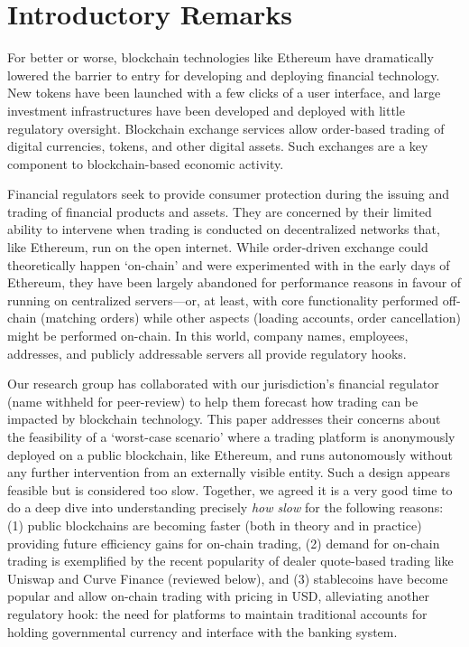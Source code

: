 
\section{Introductory Remarks}

For better or worse, blockchain technologies like Ethereum have dramatically lowered the barrier to entry for developing and deploying financial technology. New tokens have been launched with a few clicks of a user interface, and large investment infrastructures have been developed and deployed with little regulatory oversight. Blockchain exchange services allow order-based trading of digital currencies, tokens, and other digital assets. Such exchanges are a key component to blockchain-based economic activity. 

Financial regulators seek to provide consumer protection during the issuing and trading of financial products and assets. They are concerned by their limited ability to intervene when trading is conducted on decentralized networks that, like Ethereum, run on the open internet. While order-driven exchange could theoretically happen `on-chain' and were experimented with in the early days of Ethereum, they have been largely abandoned for performance reasons in favour of running on centralized servers---or, at least, with core functionality performed off-chain (\eg matching orders) while other aspects (\eg loading accounts, order cancellation) might be performed on-chain. In this world, company names, employees, addresses, and publicly addressable servers all provide regulatory hooks.

Our research group has collaborated with our jurisdiction's financial regulator (name withheld for peer-review) to help them forecast how trading can be impacted by blockchain technology. This paper addresses their concerns about the feasibility of a `worst-case scenario' where a trading platform is anonymously deployed on a public blockchain, like Ethereum, and runs autonomously without any further intervention from an externally visible entity. Such a design appears feasible but is considered too slow. Together, we agreed it is a very good time to do a deep dive into understanding precisely \textit{how slow} for the following reasons: (1) public blockchains are becoming faster (both in theory and in practice) providing future efficiency gains for on-chain trading, (2) demand for on-chain trading is exemplified by the recent popularity of dealer quote-based trading like Uniswap and Curve Finance (reviewed below), and (3) stablecoins have become popular and allow on-chain trading with pricing in USD, alleviating another regulatory hook: the need for platforms to maintain traditional accounts for holding governmental currency and interface with the banking system.

